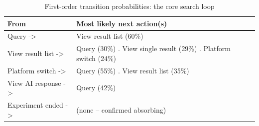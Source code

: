 \begin{table}[t]
\centering
\caption{First-order transition probabilities: the core search loop}
\label{tab:rq2-core-loop}
\begin{tabular}{ll}
\toprule
From & Most likely next action(s) \\
\midrule
Query -> & View result list (60\%) \\
View result list -> & Query (30\%) . View single result (29\%) . Platform switch (24\%) \\
Platform switch -> & Query (55\%) . View result list (35\%) \\
View AI response -> & Query (42\%) \\
Experiment ended -> & (none -- confirmed absorbing) \\
\bottomrule
\end{tabular}
\end{table}
